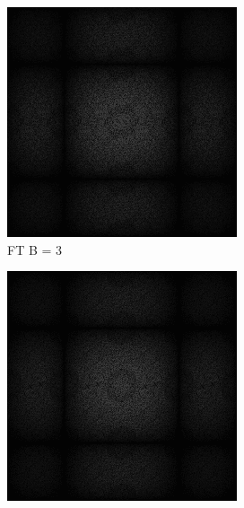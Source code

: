 \begin{figure}[H]
\begin{tcolorbox}[boxrule=4pt,sharp corners=downhill,title=Verschiedene Blockgrößen]
\begin{subfigure}[b]{0.2\linewidth}
      \includegraphics[width=\linewidth]{content/TemporalerAlg/Bilder/Sorting/DiffDimensions/3/seed_debug_5.0_small.png}
      \caption{FT B = 3}
      \label{pic:fftB_3}
    \end{subfigure}
    \begin{subfigure}[b]{0.2\linewidth}
      \includegraphics[width=\linewidth]{content/TemporalerAlg/Bilder/Sorting/DiffDimensions/4/seed_debug_5.0_small.png}

\end{subfigure}
\end{tcolorbox}
\end{figure}
